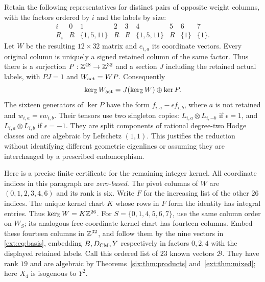 Retain the following representatives for distinct pairs of opposite
weight columns, with the factors ordered by $i$ and the labels by size:
\[
\begin{array}{c|cccccccc}
i&0&1&2&3&4&5&6&7\\\hline
R_i&R&\{1,5,11\}&R&R&\{1,5,11\}&R&\{1\}&\{1\}.
\end{array}
\]
Let $W$ be the resulting $12\times32$ matrix and $e_{i,a}$ its
coordinate vectors. Every original column is uniquely a signed retained
column of the same factor. Thus there is a surjection
$P:\mathbb Z^{48}\to\mathbb Z^{32}$ and a section $J$ including the retained actual
labels, with $PJ=1$ and $W_{\rm act}=WP$. Consequently
\[
 \ker_{\mathbb Z}W_{\rm act}
 =J(\ker_{\mathbb Z}W)\oplus\ker P.
\]
The sixteen generators of $\ker P$ have the form
$f_{i,a}-\epsilon f_{i,b}$, where $a$ is not retained and
$w_{i,a}=\epsilon w_{i,b}$. Their tensors use two singleton copies:
$L_{i,a}\otimes L_{i,-b}$ if $\epsilon=1$, and
$L_{i,a}\otimes L_{i,b}$ if $\epsilon=-1$.
They are split components of rational degree-two Hodge classes and are
algebraic by Lefschetz $(1,1)$. This justifies the reduction without
identifying different geometric eigenlines or assuming they are
interchanged by a prescribed endomorphism.

Here is a precise finite certificate for the remaining integer kernel.
All coordinate indices in this paragraph are \emph{zero-based}.
The pivot columns of $W$ are $(0,1,2,3,4,6)$ and its rank is six.
Write $F$ for the increasing list of the other $26$ indices.
The unique kernel chart $K$ whose rows in $F$ form the identity
has integral entries. Thus $\ker_{\mathbb Z}W=K\mathbb Z^{26}$.
For $S=\{0,1,4,5,6,7\}$, use the same column order on $W_S$;
its analogous free-coordinate kernel chart has fourteen columns.
Embed these fourteen columns in $\mathbb Z^{32}$, and follow them by the
nine vectors in \eqref{ext:eq:basis}, embedding $B,{D_{\mathrm{CM}}},Y$
respectively in factors $0,2,4$ with the displayed retained labels.
Call this ordered list of $23$ known vectors $\mathcal B$.
They have rank $19$ and are algebraic by
Theorems~\ref{six:thm:products} and~\ref{ext:thm:mixed}; here
$X_4$ is isogenous to $Y^2$.

